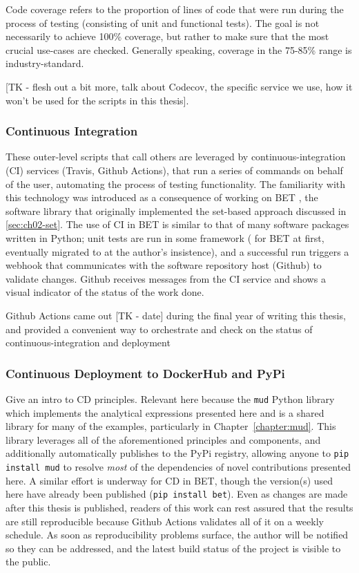 Code coverage refers to the proportion of lines of code that were run during the process of testing (consisting of unit and functional tests).
The goal is not necessarily to achieve 100\% coverage, but rather to make sure that the most crucial use-cases are checked.
Generally speaking, coverage in the 75-85\% range is industry-standard.

[TK - flesh out a bit more, talk about Codecov, the specific service we use, how it won't be used for the scripts in this thesis].


\subsubsection{Continuous Integration}\label{sec:continuous-integration}

These outer-level scripts that call others are leveraged by continuous-integration (CI) services (Travis, Github Actions), that run a series of commands on behalf of the user, automating the process of testing functionality.
The familiarity with this technology was introduced as a consequence of working on BET \cite{pyBET}, the software library that originally implemented the set-based approach discussed in \ref{sec:ch02-set}.
The use of CI in BET is similar to that of many software packages written in Python; unit tests are run in some framework ( for BET at first, eventually migrated to  at the author's insistence), and a successful run triggers a webhook that communicates with the software repository host (Github) to validate changes. Github receives messages from the CI service and shows a visual indicator of the status of the work done.

Github Actions came out [TK - date] during the final year of writing this thesis, and provided a convenient way to orchestrate and check on the status of continuous-integration and deployment

\subsubsection{Continuous Deployment to DockerHub and PyPi}
Give an intro to CD principles. Relevant here because the {\tt mud} Python library which implements the analytical expressions presented here and is a shared library for many of the examples, particularly in Chapter~\ref{chapter:mud}.
This library leverages all of the aforementioned principles and components, and additionally automatically publishes to the PyPi registry, allowing anyone to {\tt pip install mud} to resolve \emph{most} of the dependencies of novel contributions presented here.
A similar effort is underway for CD in BET, though the version(s) used here have already been published ({\tt pip install bet}).
Even as changes are made after this thesis is published, readers of this work can rest assured that the results are still reproducible because Github Actions validates all of it on a weekly schedule.
As soon as reproducibility problems surface, the author will be notified so they can be addressed, and the latest build status of the project is visible to the public.
